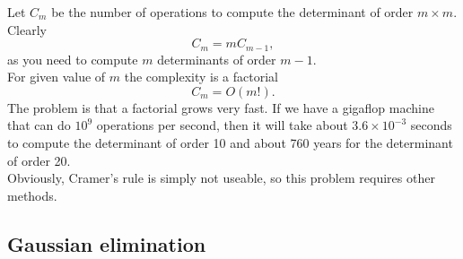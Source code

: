 \documentclass{article}
\begin{document}
Let $C_m$ be the number of operations to compute the determinant of order $m\times m$.\\
Clearly
\[
C_m = m C_{m-1},
\]
as you need to compute $m$ determinants of order $m-1$.\\
For given value of $m$ the complexity is a factorial
\[
C_m = O(m!).
\]
The problem is that a factorial grows very fast. If we have a gigaflop machine that can do $10^9$ operations per second, then it will take about $3.6\times10^{-3}$ seconds to compute the determinant of order 10 and about 760 years for the determinant of order 20.\\
Obviously, Cramer's rule is simply not useable, so this problem requires other methods. 

\subsection{Gaussian elimination}
\end{document}
